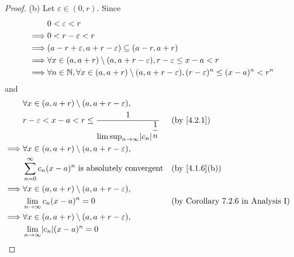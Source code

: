 \begin{proof}{(b)}
  Let \(\varepsilon \in (0, r)\).
  Since
  \begin{align*}
             & 0 < \varepsilon < r                                                                                                     \\
    \implies & 0 < r - \varepsilon < r                                                                                                 \\
    \implies & (a - r + \varepsilon, a + r - \varepsilon) \subseteq (a - r, a + r)                                                     \\
    \implies & \forall x \in (a, a + r) \setminus (a, a + r - \varepsilon), r - \varepsilon \leq x - a < r                             \\
    \implies & \forall n \in \mathbb{N}, \forall x \in (a, a + r) \setminus (a, a + r - \varepsilon), (r - \varepsilon)^n \leq (x - a)^n < r^n
  \end{align*}
  and
  \begin{align*}
             & \forall x \in (a, a + r) \setminus (a, a + r - \varepsilon),                                                                               \\
             & r - \varepsilon < x - a < r \leq \dfrac{1}{\limsup_{n \to \infty} \abs{c_n}^{\dfrac{1}{n}}} &  & \by{4.2.1}                                \\
    \implies & \forall x \in (a, a + r) \setminus (a, a + r - \varepsilon),                                                                               \\
             & \sum_{n = 0}^\infty c_n (x - a)^n \text{ is absolutely convergent}                          &  & \text{(by \cref{4.1.6}(b))}               \\
    \implies & \forall x \in (a, a + r) \setminus (a, a + r - \varepsilon),                                                                               \\
             & \lim_{n \to \infty} c_n (x - a)^n = 0                                                       &  & \text{(by Corollary 7.2.6 in Analysis I)} \\
    \implies & \forall x \in (a, a + r) \setminus (a, a + r - \varepsilon),                                                                               \\
             & \lim_{n \to \infty} \abs{c_n} (x - a)^n = 0                                                                                                \\

\end{align*}
\end{proof}
